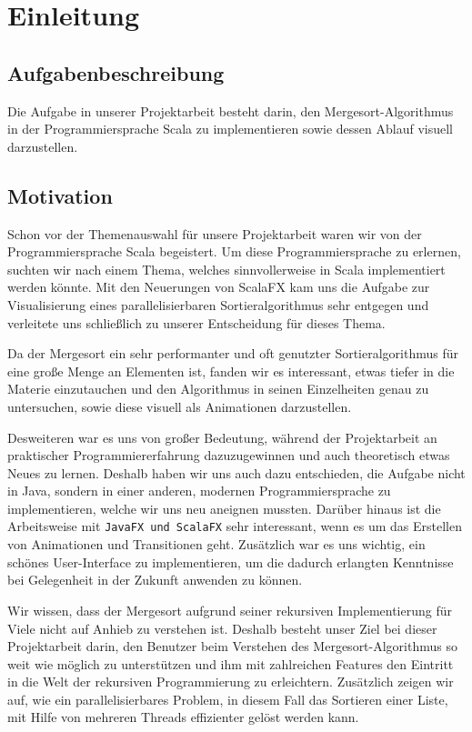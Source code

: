 \chapter{Einleitung}\label{chap:intro}
\section{Aufgabenbeschreibung}
Die Aufgabe in unserer Projektarbeit besteht darin, den Mergesort-Algorithmus in der Programmiersprache Scala zu implementieren sowie dessen Ablauf visuell darzustellen.
\section{Motivation}
Schon vor der Themenauswahl für unsere Projektarbeit waren wir von der Programmiersprache Scala begeistert. Um diese Programmiersprache zu erlernen, suchten wir nach einem Thema, welches sinnvollerweise in Scala implementiert werden könnte. Mit den Neuerungen von ScalaFX kam uns die Aufgabe zur Visualisierung eines parallelisierbaren Sortieralgorithmus sehr entgegen und verleitete uns schließlich zu unserer Entscheidung für dieses Thema.

Da der Mergesort ein sehr performanter und oft genutzter Sortieralgorithmus für eine große Menge an Elementen ist, fanden wir es interessant, etwas tiefer in die Materie einzutauchen und den Algorithmus in seinen Einzelheiten genau zu untersuchen, sowie diese visuell als Animationen darzustellen.

Desweiteren war es uns von großer Bedeutung, während der Projektarbeit an praktischer Programmiererfahrung dazuzugewinnen und auch theoretisch etwas Neues zu lernen. Deshalb haben wir uns auch dazu entschieden, die Aufgabe nicht in Java, sondern in einer anderen, modernen Programmiersprache zu implementieren, welche wir uns neu aneignen mussten. Darüber hinaus ist die Arbeitsweise mit \texttt{JavaFX und ScalaFX} sehr interessant, wenn es um das Erstellen von Animationen und Transitionen geht. Zusätzlich war es uns wichtig, ein schönes User-Interface zu implementieren, um die dadurch erlangten Kenntnisse bei Gelegenheit in der Zukunft anwenden zu können.

Wir wissen, dass der Mergesort aufgrund seiner rekursiven Implementierung für Viele nicht auf Anhieb zu verstehen ist. Deshalb besteht unser Ziel bei dieser Projektarbeit darin, den Benutzer beim Verstehen des Mergesort-Algorithmus so weit wie möglich zu unterstützen und ihm mit zahlreichen Features den Eintritt in die Welt der rekursiven Programmierung zu erleichtern. Zusätzlich zeigen wir auf, wie ein parallelisierbares Problem, in diesem Fall das Sortieren einer Liste, mit Hilfe von mehreren Threads effizienter gelöst werden kann.

